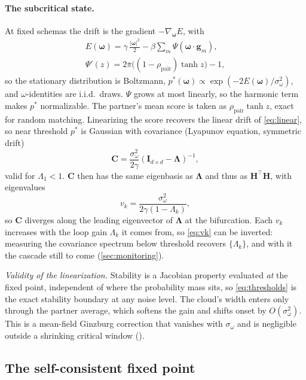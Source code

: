\documentclass[
  aps,prx,
  reprint,
  superscriptaddress,
  nofootinbib,
  longbibliography
]{revtex4-2}
\newcommand{\w}{\bm{\omega}}
\newcommand{\g}{\mathbf{g}}
\newcommand{\C}{\mathbf{C}}
\newcommand{\Lam}{\bm{\Lambda}}
\newcommand{\Id}{\mathbf{I}}
\newcommand{\rhopair}{\rho_{\mathrm{pair}}}
\newcommand{\sidn}{\sigma_{\omega}}
\newcommand{\pibar}{\bar\pi}
\newcommand{\smref}[1]{\cite[Sec.~#1]{SM}}
\begin{document}
\paragraph{The subcritical state.} At fixed schemas the drift is the gradient $-\nabla_{\w}E$, with
\begin{equation}\label{eq:energy}
\begin{gathered}
E(\w)=\gamma\,\tfrac{|\w|^2}{2}-\beta\sum_m\Psi(\w\cdot\g_m),\\[2pt]
\Psi'(z)=2\pibar\bigl((1-\rhopair)\tanh z\bigr)-1,
\end{gathered}
\end{equation}
so the stationary distribution is Boltzmann, $p^*(\w)\propto\exp(-2E(\w)/\sidn^2)$, and $\omega$-identities are i.i.d.\ draws. $\Psi$ grows at most linearly, so the harmonic term makes $p^*$ normalizable. The partner's mean score is taken as $\rhopair\tanh z$, exact for random matching. Linearizing the score recovers the linear drift of \cref{eq:linear}, so near threshold $p^*$ is Gaussian with covariance (Lyapunov equation, symmetric drift)
\begin{equation}\label{eq:C-linear}
\C=\frac{\sidn^2}{2\gamma}(\Id_{d\times d}-\Lam)^{-1},
\end{equation}
valid for $\Lambda_1<1$. $\C$ then has the same eigenbasis as $\Lam$ and thus as $\bm{H}^{\!\top}\bm{H}$, with eigenvalues
\begin{equation}\label{eq:vk}
v_k=\frac{\sidn^2}{2\gamma(1-\Lambda_k)},
\end{equation}
so $\C$ diverges along the leading eigenvector of $\Lam$ at the bifurcation. Each $v_k$ increases with the loop gain $\Lambda_k$ it comes from, so \cref{eq:vk} can be inverted: measuring the covariance spectrum below threshold recovers $\{\Lambda_k\}$, and with it the cascade still to come (\cref{sec:monitoring}).

\emph{Validity of the linearization.} Stability is a Jacobian property evaluated \emph{at} the fixed point, independent of where the probability mass sits, so \cref{eq:thresholds} is the exact stability boundary at any noise level. The cloud's width enters only through the partner average, which softens the gain and shifts onset by $O(\sidn^2)$. This is a mean-field Ginzburg correction that vanishes with $\sidn$ and is negligible outside a shrinking critical window (\smref{S6}).


\subsection{The self-consistent fixed point}\label{sec:fixedpoint}
\end{document}
